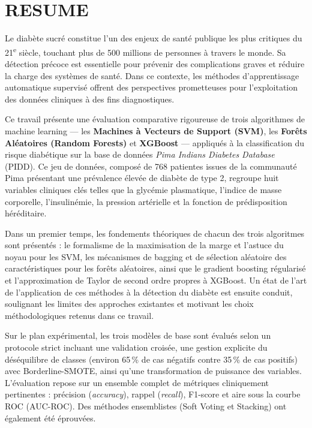 \chapter*{RESUME}

Le diabète sucré constitue l'un des enjeux de santé publique les plus critiques du
21\textsuperscript{e} siècle, touchant plus de 500 millions de personnes à travers le
monde. Sa détection précoce est essentielle pour prévenir des complications graves et
réduire la charge des systèmes de santé. Dans ce contexte, les méthodes d'apprentissage
automatique supervisé offrent des perspectives prometteuses pour l'exploitation des données
cliniques à des fins diagnostiques.

Ce travail présente une évaluation comparative rigoureuse de trois algorithmes de machine
learning — les \textbf{Machines à Vecteurs de Support (SVM)}, les \textbf{Forêts Aléatoires
(Random Forests)} et \textbf{XGBoost} — appliqués à la classification du risque diabétique
sur la base de données \textit{Pima Indians Diabetes Database} (PIDD). Ce jeu de données,
composé de 768 patientes issues de la communauté Pima présentant une prévalence élevée de
diabète de type 2, regroupe huit variables cliniques clés telles que la glycémie plasmatique,
l'indice de masse corporelle, l'insulinémie, la pression artérielle et la fonction de
prédisposition héréditaire.

Dans un premier temps, les fondements théoriques de chacun des trois algoritmes sont
présentés : le formalisme de la maximisation de la marge et l'astuce du noyau pour les SVM,
les mécanismes de bagging et de sélection aléatoire des caractéristiques pour les forêts
aléatoires, ainsi que le gradient boosting régularisé et l'approximation de Taylor de
second ordre propres à XGBoost. Un état de l'art de l'application de ces méthodes à la
détection du diabète est ensuite conduit, soulignant les limites des approches existantes et
motivant les choix méthodologiques retenus dans ce travail.

Sur le plan expérimental, les trois modèles de base sont évalués selon un protocole
strict incluant une validation croisée, une gestion explicite du déséquilibre de classes
(environ 65\,\% de cas négatifs contre 35\,\% de cas positifs) avec Borderline-SMOTE,
ainsi qu'une transformation de puissance des variables. L'évaluation repose sur un 
ensemble complet de métriques cliniquement pertinentes : précision (\textit{accuracy}), 
rappel (\textit{recall}), F1-score et aire sous la courbe ROC (AUC-ROC).
Des méthodes ensemblistes (Soft Voting et Stacking) ont également été éprouvées.

